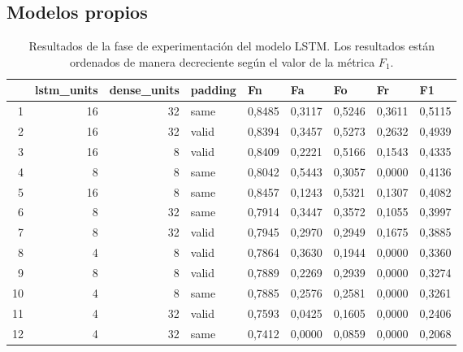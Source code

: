    
    
    \subsection{Modelos propios}
    
    
    \begin{table}[H]
    \caption{Resultados de la fase de experimentación del modelo LSTM. Los resultados están ordenados de manera decreciente según el valor de la métrica $F_1$.}
    \begin{center}
    \begin{tabular}{|r|r|r|l|r|r|r|r|r|}
    \hline
    \multicolumn{1}{|l|}{} & \multicolumn{1}{l|}{\textbf{lstm\_units}} & \multicolumn{1}{l|}{\textbf{dense\_units}} & \textbf{padding} & \multicolumn{1}{l|}{\textbf{Fn}} & \multicolumn{1}{l|}{\textbf{Fa}} & \multicolumn{1}{l|}{\textbf{Fo}} & \multicolumn{1}{l|}{\textbf{Fr}} & \multicolumn{1}{l|}{\textbf{F1}} \\ \hline
    1 & 16 & 32 & same & 0,8485 & 0,3117 & 0,5246 & 0,3611 & 0,5115 \\ \hline
    2 & 16 & 32 & valid & 0,8394 & 0,3457 & 0,5273 & 0,2632 & 0,4939 \\ \hline
    3 & 16 & 8 & valid & 0,8409 & 0,2221 & 0,5166 & 0,1543 & 0,4335 \\ \hline
    4 & 8 & 8 & same & 0,8042 & 0,5443 & 0,3057 & 0,0000 & 0,4136 \\ \hline
    5 & 16 & 8 & same & 0,8457 & 0,1243 & 0,5321 & 0,1307 & 0,4082 \\ \hline
    6 & 8 & 32 & same & 0,7914 & 0,3447 & 0,3572 & 0,1055 & 0,3997 \\ \hline
    7 & 8 & 32 & valid & 0,7945 & 0,2970 & 0,2949 & 0,1675 & 0,3885 \\ \hline
    8 & 4 & 8 & valid & 0,7864 & 0,3630 & 0,1944 & 0,0000 & 0,3360 \\ \hline
    9 & 8 & 8 & valid & 0,7889 & 0,2269 & 0,2939 & 0,0000 & 0,3274 \\ \hline
    10 & 4 & 8 & same & 0,7885 & 0,2576 & 0,2581 & 0,0000 & 0,3261 \\ \hline
    11 & 4 & 32 & valid & 0,7593 & 0,0425 & 0,1605 & 0,0000 & 0,2406 \\ \hline
    12 & 4 & 32 & same & 0,7412 & 0,0000 & 0,0859 & 0,0000 & 0,2068 \\ \hline
    \end{tabular}
    \end{center}
    \label{table:model2_result}
    \end{table}
    
